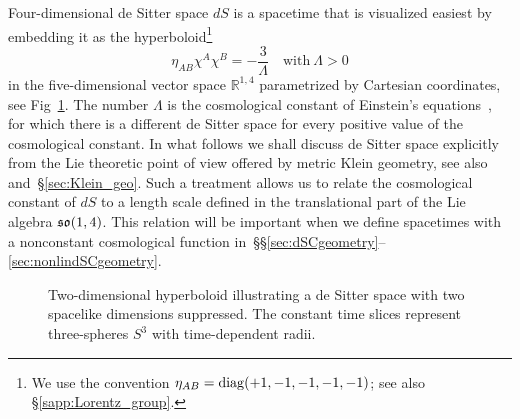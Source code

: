 \documentclass[
final,
11pt,
a4paper,
DIV=11,
headinclude=true,
footinclude=false,
bibliography=totoc,
twoside=true,  %
BCOR=5mm
]{scrbook}
\begin{document}
Four-dimensional de Sitter space $dS$ is a spacetime that is 
visualized easiest by embedding it as the hyperboloid\footnote{We 
  use the convention $\eta_{AB} = \mathrm{diag}(+1, -1, -1, -1, 
  -1)$; see also 
  \S\ref{sapp:Lorentz_group}.}~\cite{hawking:1973ls,Spradlin:2002ds}
\begin{equation*}
  \eta_{AB} \chi^A \chi^B = -\frac{3}{\Lambda}
  \quad\text{with}~\Lambda > 0
\end{equation*}
in the five-dimensional vector space $\mathds{R}^{1,4}$ 
parametrized by Cartesian coordinates, see 
Fig~\ref{fig:dSembedded}. The number $\Lambda$ is the 
cosmological constant of Einstein's equations~\cite{Wald:1984gr}, 
for which there is a different de Sitter space for every positive 
value of the cosmological constant. In what follows we shall 
discuss de Sitter space explicitly from the Lie theoretic point 
of view offered by metric Klein geometry, see 
also~\cite{kob1996found2,Wise:2010sm} and~\S\ref{sec:Klein_geo}.  
Such a treatment allows us to relate the cosmological constant of 
$dS$ to a length scale defined in the translational part of the 
Lie algebra $\mathfrak{so}(1,4)$. This relation will be important when 
we define spacetimes with a nonconstant cosmological function 
in~\S\S\ref{sec:dSCgeometry}--\ref{sec:nonlindSCgeometry}.

\begin{figure}
\iftoggle{draftVersion}{%
  \framebox[7cm][c]{%
    \textbf{XXX} Figure: de Sitter space}
}{%
\centering
\begin{tikzpicture}[scale=1.5]
\def\l{1}
\begin{axis}[
  anchor=origin,
  xmin=-1.8, xmax=1.8,  %
  ymin=-1.8, ymax=1.8,  %
  zmin=-3, zmax=3,      %
  xlabel=$\chi^4$,
  zlabel=$\chi^0$,
  axis equal,
  hide axis,
  view={0}{20},
  colormap name={Set3-3}
  ]
  \addplot3[
    surf,
    samples=50,
    samples y=35,
    domain=-1.7:1.7, y domain=0:2*pi
    ]({\l*cosh(x/\l)*cos(deg(y))},
      {\l*cosh(x/\l)*sin(deg(y))},
      {\l*sinh(x/\l)});
\end{axis}
\draw[-stealth] (1.25,-0.5) -- (1.25,0.5);
\node at (1.25,0) [anchor=west] {$\chi^0$};
\end{tikzpicture}
}%
\caption{Two-dimensional hyperboloid illustrating a de Sitter 
  space with two spacelike dimensions suppressed. The constant 
  time slices represent three-spheres $S^3$ with time-dependent 
  radii.}
\label{fig:dSembedded}
\end{figure}
\end{document}
